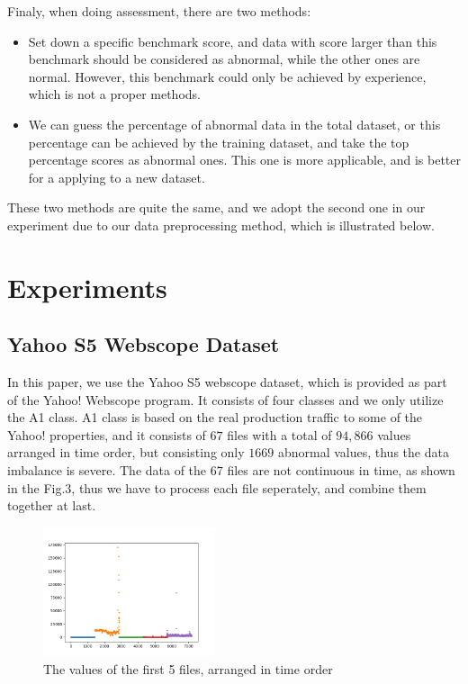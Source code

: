 \documentclass{acmtog} %
\begin{document}
Finaly, when doing assessment, there are two methods:
\begin{itemize}
	\item Set down a specific benchmark score, and data with score larger than this benchmark should be considered as abnormal, while the other ones are normal. However, this benchmark could only be achieved by experience, which is not a proper methods.
	\item We can guess the percentage of abnormal data in the total dataset, or this percentage can be achieved by the training dataset, and take the top percentage scores as abnormal ones. This one is more applicable, and is better for a applying to a new dataset.
\end{itemize}

These two methods are quite the same, and we adopt the second one in our experiment due to our data preprocessing method, which is illustrated below.


\section{Experiments}
\subsection{Yahoo S5 Webscope Dataset}
In this paper, we use the Yahoo S5 webscope dataset, which is provided as part of the Yahoo! Webscope program. It consists of four classes and we only utilize the A1 class. A1 class is based on the real production traffic to some of the Yahoo! properties, and it consists of $67$ files with a total of $94,866$ values arranged in time order, but consisting only $1669$ abnormal values, thus the data imbalance is severe. The data of the $67$ files are not continuous in time, as shown in the Fig.3, thus we have to process each file seperately, and combine them together at last.

\begin{figure}[h]
   \begin{center}
      \includegraphics[width=0.45\textwidth]{value_trend.png}
   \end{center}
\caption{The values of the first 5 files, arranged in time order}
\label{RTL}
\end{figure}
\end{document}
